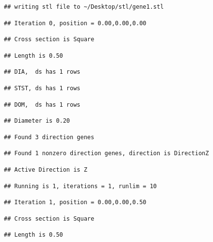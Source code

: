 \documentclass[]{article}
\begin{document}
\begin{verbatim}
## writing stl file to ~/Desktop/stl/gene1.stl
\end{verbatim}

\begin{verbatim}
## Iteration 0, position = 0.00,0.00,0.00
\end{verbatim}

\begin{verbatim}
## Cross section is Square
\end{verbatim}

\begin{verbatim}
## Length is 0.50
\end{verbatim}

\begin{verbatim}
## DIA,  ds has 1 rows
\end{verbatim}

\begin{verbatim}
## STST, ds has 1 rows
\end{verbatim}

\begin{verbatim}
## DOM,  ds has 1 rows
\end{verbatim}

\begin{verbatim}
## Diameter is 0.20
\end{verbatim}

\begin{verbatim}
## Found 3 direction genes
\end{verbatim}

\begin{verbatim}
## Found 1 nonzero direction genes, direction is DirectionZ
\end{verbatim}

\begin{verbatim}
## Active Direction is Z
\end{verbatim}

\begin{verbatim}
## Running is 1, iterations = 1, runlim = 10
\end{verbatim}

\begin{verbatim}
## Iteration 1, position = 0.00,0.00,0.50
\end{verbatim}

\begin{verbatim}
## Cross section is Square
\end{verbatim}

\begin{verbatim}
## Length is 0.50
\end{verbatim}
\end{document}
